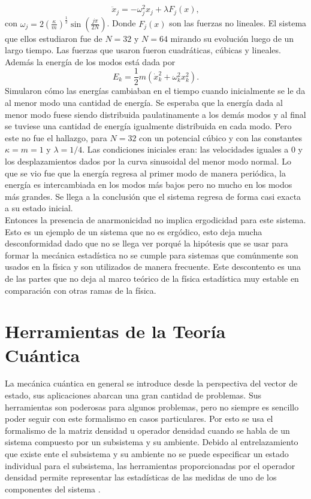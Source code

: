 \begin{equation}
\ddot{x}_{j}= - \omega_{j}^{2} x_{j} +\lambda F_{j}(x),
\end{equation}
con $\omega_{j} =2(\frac{\kappa }{m})^{\frac{1}{2}} \sin (\frac{j \pi}{2N})$. Donde $F_{j}(x)$ son las fuerzas no lineales. El sistema que ellos estudiaron fue de $N=32$  y $N=64$ mirando su evolución luego de un largo tiempo. Las fuerzas que usaron fueron cuadráticas, cúbicas y lineales. Además la energía de los modos está dada por 
\begin{equation}
E_{k} = \frac{1}{2} m(\dot{x}^{2}_{k}+ \omega_{k}^{2}x_{k}^{2}).
\end{equation}
Simularon cómo las energías cambiaban en el tiempo cuando inicialmente se le da al menor modo una cantidad de energía. Se esperaba que la energía dada al menor modo fuese siendo distribuida paulatinamente a los demás modos y al final se tuviese una cantidad de energía igualmente distribuida en cada modo. Pero este no fue el hallazgo, para $N=32$ con un potencial cúbico y con las constantes $\kappa=m=1$ y $\lambda=1/4$. Las condiciones iniciales eran: las velocidades iguales a 0 y los desplazamientos dados por la curva sinusoidal del menor modo normal. Lo que se vio fue que la energía regresa al primer modo de manera periódica, la energía es intercambiada en los modos más bajos pero no mucho en los modos más grandes. Se llega a la conclusión que el sistema regresa de forma casi exacta a su estado inicial. \\
Entonces la presencia de anarmonicidad no implica ergodicidad para este sistema. Esto es un ejemplo de un sistema que no es ergódico, esto deja mucha desconformidad dado que no se llega ver porqué la hipótesis que se usar para formar la mecánica estadística no se cumple para sistemas que comúnmente  son usados en la física y son utilizados de manera frecuente. Este descontento es una de las partes que no deja al marco teórico de la física estadística muy estable en comparación con otras ramas de la física.


\section{Herramientas de la Teoría Cuántica}
La mecánica cuántica en general se introduce desde la perspectiva del vector de estado, sus aplicaciones abarcan una gran cantidad de problemas. Sus herramientas son poderosas para algunos problemas, pero no siempre es sencillo poder seguir con este formalismo en casos particulares. Por esto se usa el formalismo de la matriz densidad u operador densidad cuando se habla de un sistema compuesto por un subsistema y su ambiente. Debido al entrelazamiento que existe ente el subsistema y su ambiente no se puede especificar un estado individual para el subsistema, las herramientas proporcionadas por el operador densidad permite representar las estadísticas de las medidas de uno de los componentes del sistema \cite{Decoherence}.
\\
